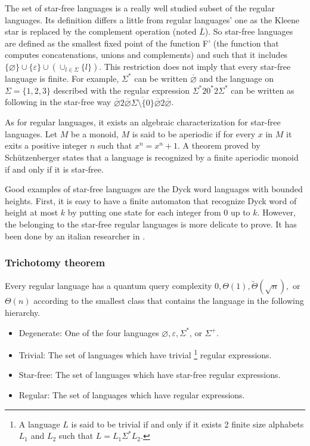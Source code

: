 The set of star-free languages is a really well studied subset of the regular languages.
Its definition differs a little from regular languages' one as the Kleene star is replaced
by the complement operation (noted $\overline{L}$). So star-free languages are defined
as the smallest fixed point of the function F' (the function that computes concatenations, unions
and complements) and such that it includes
$\{\varnothing\} \cup \{\varepsilon\} \cup(\cup_{l\in\Sigma}\{l\})$.
This restriction does not imply that every star-free language is finite.
For example, $\Sigma^*$ can be written $\overline{\varnothing}$ and the
language on $\Sigma = \{1, 2, 3\}$ described with the regular expression
$\Sigma^*20^*2\Sigma^*$ can be written as following in the star-free way
$\overline{\varnothing}2\overline{\overline{\varnothing}\Sigma{\setminus}
        \{0\}\overline{\varnothing}}2\overline{\varnothing}$.

As for regular languages, it exists an algebraic characterization for star-free
languages. Let $M$ be a monoid, $M$ is said to be aperiodic if for every $x$ in
$M$ it exits a positive integer $n$ such that $x^n=x^n+1$. A theorem proved by
Schützenberger \cite{Schtzenberger1965OnFM} states that a language is recognized
by a finite aperiodic monoid if and only if it is star-free.

Good examples of star-free languages are the Dyck word languages with bounded
heights. First, it is easy to have a finite automaton that recognize Dyck word
of height at most $k$ by putting one state for each integer from 0 up to $k$.
However, the belonging to the star-free regular languages is more delicate to
prove. It has been done by an italian researcher in
\cite[1978]{dyck_height_bound_star_free}.

\subsubsection{Trichotomy theorem}

\begin{theorem}
    Every regular language has a quantum query complexity
    \(0,\Theta(1), \tilde{\Theta}(\sqrt{n}),\) or \(\Theta(n) \)
    according to the smallest class that contains
    the language in the following hierarchy.
    \begin{itemize}
        \item Degenerate: One of the four languages \(\varnothing, \varepsilon, \Sigma^*\), or \(\Sigma^+\).
        \item Trivial: The set of languages which have trivial
              \footnote{A language $L$ is said to be trivial if and only if it exists 2 finite size alphabets
                  $L_1$ and $L_2$ such that $L = L_1 \Sigma^* L_2$.}
              regular expressions.
        \item Star-free: The set of languages which have star-free regular expressions.
        \item Regular: The set of languages which have regular expressions.
    \end{itemize}
\end{theorem}

